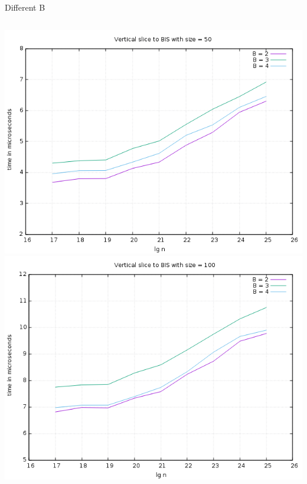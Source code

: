 \documentclass[pdf]{beamer}
\begin{document}
\begin{frame}{Different B}
  \begin{columns}
    \includegraphics[scale=0.32]{pictures/analysis/comparing_BIS_50.png}
    \includegraphics[scale=0.32]{pictures/analysis/comparing_BIS_100.png}
  \end{columns}
\end{frame}
\end{document}
